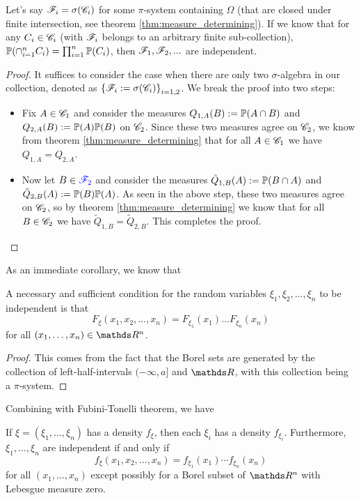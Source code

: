 \begin{lemma} \label{lem:independence_shortcut}
Let's say $\mathcal{F}_i = \sigma(\mathcal{C}_i)$ for some $\pi$-system containing $\Omega$ (that are closed under finite intersection, see theorem \ref{thm:measure_determining}). If we know that for any $C_i \in \mathcal{C}_i$ (with $\mathcal{F}_i$ belongs to an arbitrary finite sub-collection), $\mathbb{P}(\cap_{i=1}^n C_i) = \prod_{i=1}^n \mathbb{P}(C_i)$, then $\mathcal{F}_1, \mathcal{F}_2,...$ are independent.
\end{lemma}

\begin{proof}
It suffices to consider the case when there are only two $\sigma$-algebra in our collection, denoted as $\left\{ \mathcal{F}_i := \sigma(\mathcal{C}_i) \right \}_{i=1,2}$. We break the proof into two steps: 
\begin{itemize}
\item Fix $A \in \mathcal{C}_1$ and consider the measures $Q_{1,A}(B) := \mathbb{P}(A \cap B)$ and $Q_{2,A}(B) := \mathbb{P}(A) \mathbb{P}(B)$ on $\mathcal{C}_2$. Since these two measures agree on $\mathcal{C}_2$, we know from theorem \ref{thm:measure_determining} that for all $A \in \mathcal{C}_1$ we have $Q_{1,A} = Q_{2,A}$.
\item Now let $B \in \textcolor{blue}{\mathcal{F}_2}$ and consider the measures $\tilde{Q}_{1,B}(A) := \mathbb{P}(B \cap A)$ and $\tilde{Q}_{2,B}(A) := \mathbb{P}(B) \mathbb{P}(A)$. As seen in the above step, these two measures agree on $\mathcal{C}_2$, so by theorem \ref{thm:measure_determining} we know that for all $B \in \mathcal{C}_2$ we have $\tilde{Q}_{1,B} = \tilde{Q}_{2,B}$. This completes the proof.
\end{itemize}
\end{proof}

As an immediate corollary, we know that
\begin{corollary}
A necessary and sufficient condition for the random variables $\xi_1, \xi_2, \dots,\xi_n$ to be independent is that
\begin{equation}
    F_\xi(x_1,x_2,\dots,x_n) = F_{\xi_1}(x_1)\dots F_{\xi_n}(x_n)
\end{equation}
for all $(x_1,\dots, x_n)\in \R^n$.
\end{corollary}

\begin{proof}
This comes from the fact that the Borel sets are generated by the collection of left-half-intervals $(-\infty,a]$ and $\R$, with this collection being a $\pi$-system.
\end{proof}

Combining with Fubini-Tonelli theorem, we have
\begin{corollary}
If $\xi = (\xi_1, \dots, \xi_n)$ has a density $f_\xi$, then each $\xi_i$ has a density $f_{\xi_i}$. Furthermore, $\xi_1, \dots, \xi_n$ are independent if and only if 
\begin{equation}
    f_\xi(x_1, x_2, \dots, x_n) = f_{\xi_1}(x_1)\cdots f_{\xi_n}(x_n)
\end{equation}
for all $(x_1, \dots , x_n)$ except possibly for a Borel subset of $\R^n$ with Lebesgue measure zero.
\end{corollary}

